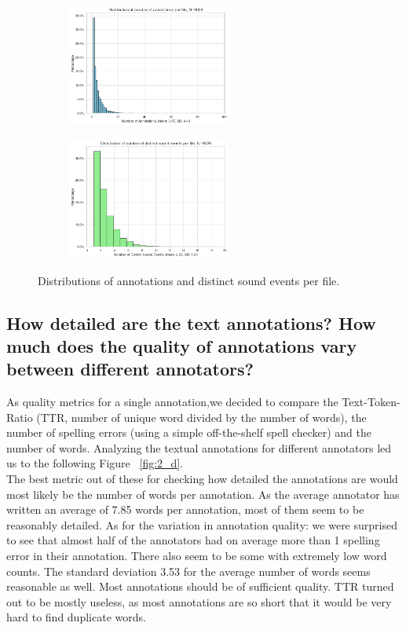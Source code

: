 \begin{figure}[htbp]
  \centering
  \begin{subfigure}[b]{0.49\textwidth}
    \includegraphics[width=\textwidth, height=4cm]{figs/annotation_dist.png}
  \end{subfigure}
  \hfill
  \begin{subfigure}[b]{0.49\textwidth}
    \includegraphics[width=\textwidth, height=4cm]{figs/sound_event_dist.png}
  \end{subfigure}
  \caption{Distributions of annotations and distinct sound events per file.}
  \label{fig:2_c}
\end{figure}

\subsection{How detailed are the text annotations? How much does the quality of annotations vary between
different annotators?}
\label{sec:Annotation Quality:b2}
As quality metrics for a single annotation,we decided to compare the Text-Token-Ratio (TTR, number of unique word divided by the number of words), the number of spelling errors (using a simple off-the-shelf spell checker) and the number of words. Analyzing the textual annotations for different annotators led us to the following Figure ~\ref{fig:2_d}.\\
The best metric out of these for checking how detailed the annotations are would most likely be the number of words per annotation. As the average annotator has written an average of 7.85 words per annotation, most of them seem to be reasonably detailed.
As for the variation in annotation quality: we were surprised to see that almost half of the annotators had on average more than 1 spelling error in their annotation. There also seem to be some with extremely low word counts. The standard deviation 3.53 for the average number of words seems reasonable as well. Most annotations should be of sufficient quality.
TTR turned out to be mostly useless, as most annotations are so short that it would be very hard to find duplicate words.

